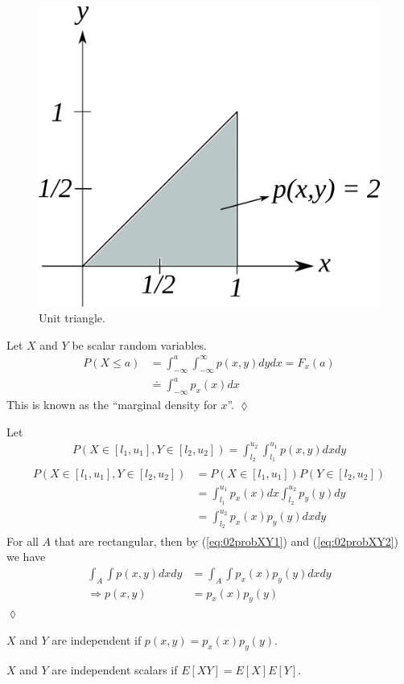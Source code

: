 \begin{figure}[ht!]
	\centering
	\includegraphics[width=.3\textwidth]{images/02unitTriangle}
	\caption{Unit triangle.}
	\label{fig:02unitTriangle}
\end{figure}

\begin{example}
Let $X$ and $Y$ be scalar random variables.
\begin{align*}
P(X\leq a) &= \int_{-\infty}^a \int_{-\infty}^\infty p(x,y)dydx = F_x(a) \\
&\doteq \int_{-\infty}^a p_x(x)dx
\end{align*}
This is known as the ``marginal density for $x$''.
$\lozenge$
\end{example}

\begin{example}
Let
\begin{align}
\label{eq:02probXY1}
P(X\in[l_1,u_1], Y\in[l_2,u_2]) = \int_{l_2}^{u_2} \int_{l_1}^{u_1} p(x,y)dxdy
\end{align}
\begin{align}
\label{eq:02probXY2}
\begin{split}
P(X\in[l_1,u_1], Y\in[l_2,u_2]) &= P(X\in[l_1,u_1]) P(Y\in[l_2,u_2]) \\
&= \int_{l_1}^{u_1}p_x(x)dx \int_{l_2}^{u_2}p_y(y)dy \\
&= \int_{l_2}^{u_2}p_x(x)p_y(y)dxdy
\end{split}
\end{align}
For all $A$ that are rectangular, then by (\ref{eq:02probXY1}) and (\ref{eq:02probXY2}) we have
\begin{align*}
\int_A\int p(x,y)dxdy &= \int_A\int p_x(x)p_y(y)dxdy \\
\Rightarrow p(x,y) &= p_x(x)p_y(y)
\end{align*}
$\lozenge$
\end{example}

\begin{theorem}
$X$ and $Y$ are independent if $p(x,y) = p_x(x)p_y(y)$.
\end{theorem}

\begin{theorem}
$X$ and $Y$ are independent scalars if $E[XY] = E[X]E[Y]$.
\end{theorem}


